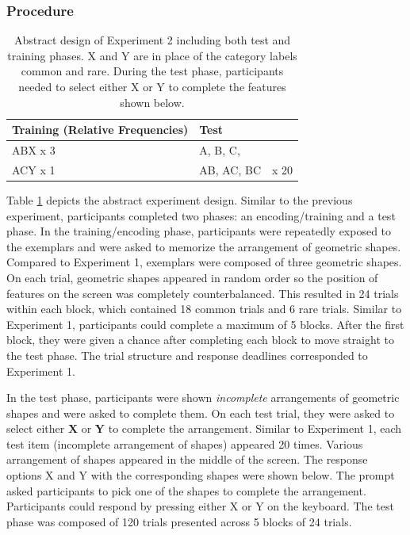 \documentclass[10pt,letterpaper]{article}
\begin{document}
\subsubsection{Procedure}

\begin{table}[!ht]
  \begin{center}
    \caption{Abstract design of Experiment 2 including both test and training phases. X and Y are in place of the category labels common and rare. During the test phase, participants needed to select either X or Y to complete the features shown below.\\}
    \label{tab:abstract-exp2}
    \begin{tabular}{llr} %
      \textbf{Training (Relative Frequencies)} & \textbf{Test}& \\
      \hline
      ABX x 3 &  A, B, C,        & \\
      ACY x 1 &  AB, AC, BC      & x 20 \\
      \hline
    \end{tabular}
  \end{center}
\end{table}

Table \ref*{tab:abstract-exp2} depicts the abstract experiment design.
Similar to the previous experiment, participants completed two phases: an encoding/training and a test phase.
In the training/encoding phase, participants were repeatedly exposed to the exemplars and were asked to memorize the arrangement of geometric shapes.
Compared to Experiment 1, exemplars were composed of three geometric shapes.
On each trial, geometric shapes appeared in random order so the position of features on the screen was completely counterbalanced.
This resulted in 24 trials within each block, which contained 18 common trials and 6 rare trials.
Similar to Experiment 1, participants could complete a maximum of 5 blocks.
After the first block, they were given a chance after completing each block to move straight to the test phase.
The trial structure and response deadlines corresponded to Experiment 1.

In the test phase, participants were shown \textit{incomplete} arrangements of geometric shapes and were asked to complete them.
On each test trial, they were asked to select either \textbf{X} or \textbf{Y} to complete the arrangement.
Similar to Experiment 1, each test item (incomplete arrangement of shapes) appeared 20 times.
Various arrangement of shapes appeared in the middle of the screen.
The response options X and Y with the corresponding shapes were shown below.
The prompt asked participants to pick one of the shapes to complete the arrangement.
Participants could respond by pressing either X or Y on the keyboard.
The test phase was composed of 120 trials presented across 5 blocks of 24 trials.
\\
\end{document}
